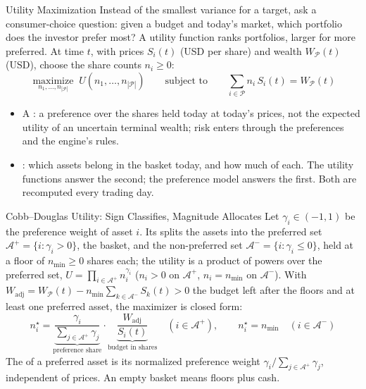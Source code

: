 \documentclass[aspectratio=169,11pt]{beamer}
\newcommand{\Ap}{\mathcal{A}^{+}}
\newcommand{\Am}{\mathcal{A}^{-}}
\newcommand{\WP}{W_{\mathcal{P}}}
\newcommand{\Wadj}{W_{\mathrm{adj}}}
\newcommand{\np}{|\mathcal P|}
\begin{document}
\begin{frame}{Utility Maximization}
  Instead of the smallest variance for a target, ask a consumer-choice question:
  given a budget and today's market, which portfolio does the investor prefer
  most? A utility function ranks portfolios, larger for more preferred. At time
  $t$, with prices $S_i(t)$ (USD per share) and wealth $\WP(t)$ (USD), choose the
  share counts $n_i\ge0$:
  \[
    \boxed{\operatorname*{maximize}_{n_1,\ldots,n_{\np}}\;U(n_1,\ldots,n_{\np})
      \qquad\text{subject to}\qquad\sum_{i\in\mathcal P}n_i\,S_i(t)=\WP(t)}
  \]
  \begin{itemize}\setlength{\itemsep}{0.35em}
    \item A : a preference over the shares held today at
      today's prices, not the expected utility of an uncertain terminal wealth;
      risk enters through the preferences and the engine's rules.
    \item {}: which assets belong in the basket today,
      and how much of each. The utility functions answer the second; the
      preference model answers the first. Both are recomputed every trading day.
  \end{itemize}
\end{frame}

\begin{frame}{Cobb--Douglas Utility: Sign Classifies, Magnitude Allocates}
  Let $\gamma_i\in(-1,1)$ be the preference weight of asset $i$. Its 
  splits the assets into the preferred set $\Ap=\{i:\gamma_i>0\}$, the basket, and
  the non-preferred set $\Am=\{i:\gamma_i\le0\}$, held at a floor of $n_{\min}\ge0$
  shares each; the utility is a product of powers over the preferred set,
  $U=\prod_{i\in\Ap}n_i^{\gamma_i}$ ($n_i>0$ on $\Ap$, $n_i=n_{\min}$ on $\Am$).
  With $\Wadj=\WP(t)-n_{\min}\sum_{k\in\Am}S_k(t)>0$ the budget left after the
  floors and at least one preferred asset, the maximizer is closed form:
  \[
    \boxed{n_i^\star=\underbrace{\frac{\gamma_i}{\sum_{j\in\Ap}\gamma_j}}_{\text{preference share}}
      \cdot\underbrace{\frac{\Wadj}{S_i(t)}}_{\text{budget in shares}}\quad(i\in\Ap),
      \qquad n_i^\star=n_{\min}\quad(i\in\Am)}
  \]
  The  of a preferred asset is
  its normalized preference weight $\gamma_i/\sum_{j\in\Ap}\gamma_j$, independent
  of prices. An empty basket means floors plus cash.
\end{frame}
\end{document}

